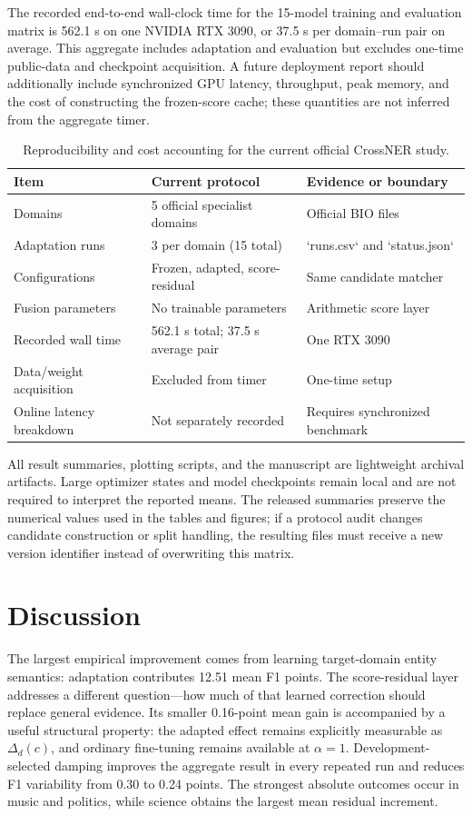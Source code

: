 \documentclass[a4paper,fleqn,numbers,doubleblind]{cas-dc}
\begin{document}
The recorded end-to-end wall-clock time for the 15-model training and evaluation matrix is 562.1 s on one NVIDIA RTX 3090, or 37.5 s per domain--run pair on average. This aggregate includes adaptation and evaluation but excludes one-time public-data and checkpoint acquisition. A future deployment report should additionally include synchronized GPU latency, throughput, peak memory, and the cost of constructing the frozen-score cache; these quantities are not inferred from the aggregate timer.

\begin{table}[t]
\centering
\caption{Reproducibility and cost accounting for the current official CrossNER study.}
\label{tab:cost}
\begin{tabular}{lll}
\toprule
Item & Current protocol & Evidence or boundary\\
\midrule
Domains & 5 official specialist domains & Official BIO files\\
Adaptation runs & 3 per domain (15 total) & `runs.csv` and `status.json`\\
Configurations & Frozen, adapted, score-residual & Same candidate matcher\\
Fusion parameters & No trainable parameters & Arithmetic score layer\\
Recorded wall time & 562.1 s total; 37.5 s average pair & One RTX 3090\\
Data/weight acquisition & Excluded from timer & One-time setup\\
Online latency breakdown & Not separately recorded & Requires synchronized benchmark\\
\bottomrule
\end{tabular}
\end{table}

All result summaries, plotting scripts, and the manuscript are lightweight archival artifacts. Large optimizer states and model checkpoints remain local and are not required to interpret the reported means. The released summaries preserve the numerical values used in the tables and figures; if a protocol audit changes candidate construction or split handling, the resulting files must receive a new version identifier instead of overwriting this matrix.

\section{Discussion}
The largest empirical improvement comes from learning target-domain entity semantics: adaptation contributes 12.51 mean F1 points. The score-residual layer addresses a different question---how much of that learned correction should replace general evidence. Its smaller 0.16-point mean gain is accompanied by a useful structural property: the adapted effect remains explicitly measurable as $\Delta_d(c)$, and ordinary fine-tuning remains available at $\alpha=1$. Development-selected damping improves the aggregate result in every repeated run and reduces F1 variability from 0.30 to 0.24 points. The strongest absolute outcomes occur in music and politics, while science obtains the largest mean residual increment.
\end{document}
